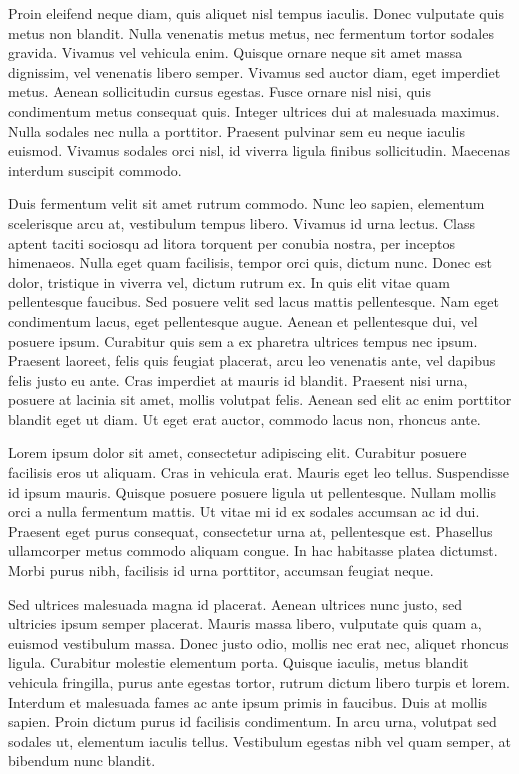 Proin eleifend neque diam, quis aliquet nisl tempus iaculis. 
Donec vulputate quis metus non blandit. 
Nulla venenatis metus metus, nec fermentum tortor sodales gravida. 
Vivamus vel vehicula enim. 
Quisque ornare neque sit amet massa dignissim, vel venenatis libero semper. 
Vivamus sed auctor diam, eget imperdiet metus. 
Aenean sollicitudin cursus egestas. 
Fusce ornare nisl nisi, quis condimentum metus consequat quis. 
Integer ultrices dui at malesuada maximus. 
Nulla sodales nec nulla a porttitor. 
Praesent pulvinar sem eu neque iaculis euismod. 
Vivamus sodales orci nisl, id viverra ligula finibus sollicitudin. 
Maecenas interdum suscipit commodo.

Duis fermentum velit sit amet rutrum commodo. 
Nunc leo sapien, elementum scelerisque arcu at, vestibulum tempus libero. 
Vivamus id urna lectus. 
Class aptent taciti sociosqu ad litora torquent per conubia nostra, per inceptos himenaeos. 
Nulla eget quam facilisis, tempor orci quis, dictum nunc. 
Donec est dolor, tristique in viverra vel, dictum rutrum ex. 
In quis elit vitae quam pellentesque faucibus. 
Sed posuere velit sed lacus mattis pellentesque. 
Nam eget condimentum lacus, eget pellentesque augue. 
Aenean et pellentesque dui, vel posuere ipsum. 
Curabitur quis sem a ex pharetra ultrices tempus nec ipsum. 
Praesent laoreet, felis quis feugiat placerat, arcu leo venenatis ante, vel dapibus felis justo eu ante. 
Cras imperdiet at mauris id blandit. 
Praesent nisi urna, posuere at lacinia sit amet, mollis volutpat felis. 
Aenean sed elit ac enim porttitor blandit eget ut diam. 
Ut eget erat auctor, commodo lacus non, rhoncus ante.

Lorem ipsum dolor sit amet, consectetur adipiscing elit. 
Curabitur posuere facilisis eros ut aliquam. 
Cras in vehicula erat. 
Mauris eget leo tellus. 
Suspendisse id ipsum mauris. 
Quisque posuere posuere ligula ut pellentesque. 
Nullam mollis orci a nulla fermentum mattis. 
Ut vitae mi id ex sodales accumsan ac id dui. 
Praesent eget purus consequat, consectetur urna at, pellentesque est. 
Phasellus ullamcorper metus commodo aliquam congue. 
In hac habitasse platea dictumst. 
Morbi purus nibh, facilisis id urna porttitor, accumsan feugiat neque.

Sed ultrices malesuada magna id placerat. Aenean ultrices nunc justo, sed ultricies ipsum semper placerat. Mauris massa libero, vulputate quis quam a, euismod vestibulum massa. Donec justo odio, mollis nec erat nec, aliquet rhoncus ligula. Curabitur molestie elementum porta. Quisque iaculis, metus blandit vehicula fringilla, purus ante egestas tortor, rutrum dictum libero turpis et lorem. Interdum et malesuada fames ac ante ipsum primis in faucibus. Duis at mollis sapien. Proin dictum purus id facilisis condimentum. In arcu urna, volutpat sed sodales ut, elementum iaculis tellus. Vestibulum egestas nibh vel quam semper, at bibendum nunc blandit.

